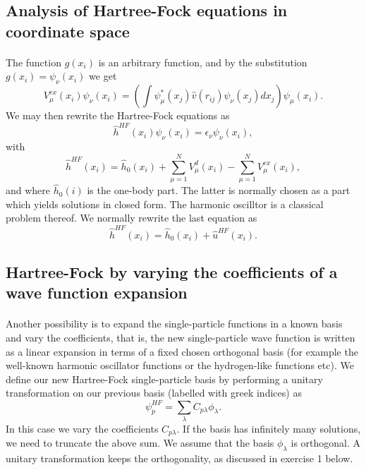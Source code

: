 \documentclass[%
twoside,                 %
final,                   %
10pt]{article}
\begin{document}
\subsection{Analysis of Hartree-Fock equations in coordinate space}

\paragraph{}
The function $g(x_i)$ is an arbitrary function,
and by the substitution $g(x_i) = \psi_{\nu}(x_i)$
we get
\begin{equation*}
  V_{\mu}^{ex}(x_i) \psi_{\nu}(x_i) 
  = \left(\int \psi_{\mu}^*(x_j) 
 \hat{v}(r_{ij})\psi_{\nu}(x_j)
  dx_j\right)\psi_{\mu}(x_i).
\end{equation*}
We may then rewrite the Hartree-Fock equations as
\[
  \hat{h}^{HF}(x_i) \psi_{\nu}(x_i) = \epsilon_{\nu}\psi_{\nu}(x_i),
\]
with
\[
  \hat{h}^{HF}(x_i)= \hat{h}_0(x_i) + \sum_{\mu=1}^NV_{\mu}^{d}(x_i) -
  \sum_{\mu=1}^NV_{\mu}^{ex}(x_i),
\]
and where $\hat{h}_0(i)$ is the one-body part. The latter is normally chosen as a part which yields solutions in closed form. The harmonic oscilltor is a classical problem thereof.
We normally rewrite the last equation as
\[
  \hat{h}^{HF}(x_i)= \hat{h}_0(x_i) + \hat{u}^{HF}(x_i). 
\]




\subsection{Hartree-Fock by varying the coefficients of a wave function expansion}

\paragraph{}
Another possibility is to expand the single-particle functions in a known basis  and vary the coefficients, 
that is, the new single-particle wave function is written as a linear expansion
in terms of a fixed chosen orthogonal basis (for example the well-known harmonic oscillator functions or the hydrogen-like functions etc).
We define our new Hartree-Fock single-particle basis by performing a unitary transformation 
on our previous basis (labelled with greek indices) as
\begin{equation}
\psi_p^{HF}  = \sum_{\lambda} C_{p\lambda}\phi_{\lambda}. \label{eq:newbasis}
\end{equation}
In this case we vary the coefficients $C_{p\lambda}$. If the basis has infinitely many solutions, we need
to truncate the above sum.  We assume that the basis $\phi_{\lambda}$ is orthogonal. A unitary transformation keeps the orthogonality, as discussed in exercise 1 below.
\end{document}
